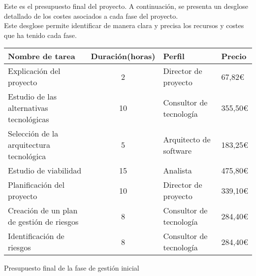 Este es el presupuesto final del proyecto. A continuación, se presenta un desglose detallado de los costes asociados a cada fase del proyecto.
\\[1ex]
Este desglose permite identificar de manera clara y precisa los recursos y costes que ha tenido cada fase.
\begin{planificacion}
	\centering
	\begin{tabular}{ | m{8.5cm} | c | m{2.5cm} |  m{1.5cm} |}
		\hline
		\textbf{Nombre de tarea}                  & \textbf{Duración(horas)} & \textbf{Perfil}         & \textbf{Precio} \\\hline
		Explicación del proyecto                  & 2                        & Director de proyecto    & 67,82€          \\\hline
		Estudio de las alternativas tecnológicas  & 10                       & Consultor de tecnología & 355,50€         \\\hline
		Selección de la arquitectura tecnológica  & 5                        & Arquitecto de software  & 183,25€         \\\hline
		Estudio de viabilidad                     & 15                       & Analista                & 475,80€         \\\hline
		Planificación del proyecto                & 10                       & Director de proyecto    & 339,10€         \\\hline
		Creación de un plan de gestión de riesgos & 8                        & Consultor de tecnología & 284,40€         \\\hline
		Identificación de riesgos                 & 8                        & Consultor de tecnología & 284,40€         \\\hline
	\end{tabular}
	\caption{Presupuesto final de la fase de gestión inicial}
\end{planificacion}

